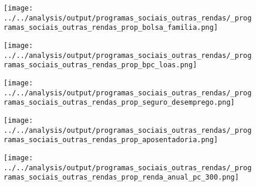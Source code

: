 \begin{frame}[label=_programas_sociais_outras_rendas_prop_bolsa_familia]{}
\textit{\hyperlink{_programas_sociais}{}}
\begin{figure}
  \centering
  \texttt{[image: ../../analysis/output/programas\_sociais\_outras\_rendas/\_programas\_sociais\_outras\_rendas\_prop\_bolsa\_familia.png]}
  \caption{}
  \label{fig:_programas_sociais_outras_rendas_prop_bolsa_familia}
\end{figure}
\end{frame}

\begin{frame}[label=_programas_sociais_outras_rendas_prop_bpc_loas]{}
\textit{\hyperlink{_programas_sociais}{}}
\begin{figure}
  \centering
  \texttt{[image: ../../analysis/output/programas\_sociais\_outras\_rendas/\_programas\_sociais\_outras\_rendas\_prop\_bpc\_loas.png]}
  \caption{}
  \label{fig:_programas_sociais_outras_rendas_prop_bpc_loas}
\end{figure}
\end{frame}


\begin{frame}[label=_programas_sociais_outras_rendas_prop_seguro_desemprego]{}
\textit{\hyperlink{_programas_sociais}{}}
\begin{figure}
  \centering
  \texttt{[image: ../../analysis/output/programas\_sociais\_outras\_rendas/\_programas\_sociais\_outras\_rendas\_prop\_seguro\_desemprego.png]}
  \caption{}
  \label{fig:_programas_sociais_outras_rendas_prop_seguro_desemprego}
\end{figure}
\end{frame}

\begin{frame}[label=_programas_sociais_outras_rendas_prop_aposentadoria]{}
\textit{\hyperlink{_programas_sociais}{}}
\begin{figure}
  \centering
  \texttt{[image: ../../analysis/output/programas\_sociais\_outras\_rendas/\_programas\_sociais\_outras\_rendas\_prop\_aposentadoria.png]}
  \caption{}
  \label{fig:_programas_sociais_outras_rendas_prop_aposentadoria}
\end{figure}
\end{frame}


\begin{frame}[label=_programas_sociais_outras_rendas_prop_bpc_loas]{}
\textit{\hyperlink{_programas_sociais}{}}
\begin{figure}
  \centering
  \texttt{[image: ../../analysis/output/programas\_sociais\_outras\_rendas/\_programas\_sociais\_outras\_rendas\_prop\_renda\_anual\_pc\_300.png]}
  \caption{}
  \label{fig:_programas_sociais_outras_rendas_prop_renda_anual_pc_300}
\end{figure}
\end{frame}